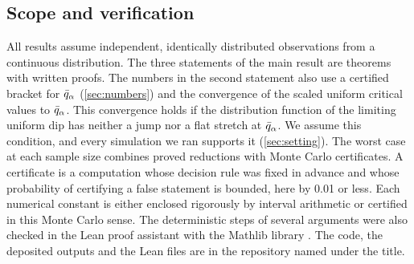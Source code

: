 \subsection{Scope and verification}
All results assume independent, identically distributed observations from a continuous distribution. The three statements of the main result are theorems with written proofs. The numbers in the second statement also use a certified bracket for $\bar q_\alpha$ (\cref{sec:numbers}) and the convergence of the scaled uniform critical values to $\bar q_\alpha$. This convergence holds if the distribution function of the limiting uniform dip has neither a jump nor a flat stretch at $\bar q_\alpha$. We assume this condition, and every simulation we ran supports it (\cref{sec:setting}). The worst case at each sample size combines proved reductions with Monte Carlo certificates. A certificate is a computation whose decision rule was fixed in advance and whose probability of certifying a false statement is bounded, here by 0.01 or less. Each numerical constant is either enclosed rigorously by interval arithmetic or certified in this Monte Carlo sense. The deterministic steps of several arguments were also checked in the Lean proof assistant \cite{Lean4} with the Mathlib library \cite{Mathlib}. The code, the deposited outputs and the Lean files are in the repository named under the title.

